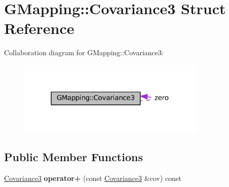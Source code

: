 \hypertarget{structGMapping_1_1Covariance3}{}\section{G\+Mapping\+:\+:Covariance3 Struct Reference}
\label{structGMapping_1_1Covariance3}


Collaboration diagram for G\+Mapping\+:\+:Covariance3\+:
\nopagebreak
\begin{figure}[H]
\begin{center}
\leavevmode
\includegraphics[width=255pt]{structGMapping_1_1Covariance3__coll__graph}
\end{center}
\end{figure}
\subsection*{Public Member Functions}
\begin{DoxyCompactItemize}
\item 
\mbox{\label{structGMapping_1_1Covariance3_a28d60d44d32e4ef1f567a714cebc57b6}} 
\hyperlink{structGMapping_1_1Covariance3}{Covariance3} {\bfseries operator+} (const \hyperlink{structGMapping_1_1Covariance3}{Covariance3} \&cov) const
\end{DoxyCompactItemize}
